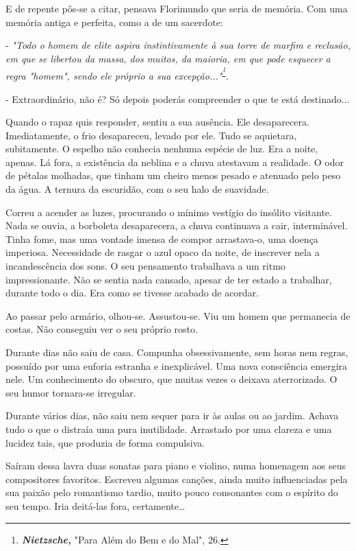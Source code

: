 E de repente pôs-se a citar, pensava Florimundo que seria de memória.
Com uma memória antiga e perfeita, como a de um sacerdote:

- \emph{"Todo o homem de elite aspira instintivamente à sua torre de
marfim e reclusão, em que se libertou da massa, dos muitos, da maioria,
em que pode esquecer a regra "homem", sendo ele próprio a sua
excepção..."}\textsuperscript{\emph{\footnote{\emph{\textbf{Nietzsche,
  }}"Para Além do Bem e do Mal", 26.}}}\emph{.}

- Extraordinário, não é? Só depois poderás compreender o que te está
destinado...

Quando o rapaz quis responder, sentiu a sua ausência. Ele desaparecera.
Imediatamente, o frio desapareceu, levado por ele. Tudo se aquietara,
subitamente. O espelho não conhecia nenhuma espécie de luz. Era a noite,
apenas. Lá fora, a existência da neblina e a chuva atestavam a
realidade. O odor de pétalas molhadas, que tinham um cheiro menos pesado
e atenuado pelo peso da água. A ternura da escuridão, com o seu halo de
suavidade.

Correu a acender as luzes, procurando o mínimo vestígio do insólito
visitante. Nada se ouvia, a borboleta desaparecera, a chuva continuava a
cair, interminável. Tinha fome, mas uma vontade imensa de compor
arrastava-o, uma doença imperiosa. Necessidade de rasgar o azul opaco da
noite, de inscrever nela a incandescência dos sons. O seu pensamento
trabalhava a um ritmo impressionante. Não se sentia nada cansado, apesar
de ter estado a trabalhar, durante todo o dia. Era como se tivesse
acabado de acordar.

Ao passar pelo armário, olhou-se. Assustou-se. Viu um homem que
permanecia de costas. Não conseguiu ver o seu próprio rosto.

Durante dias não saiu de casa. Compunha obsessivamente, sem horas nem
regras, possuído por uma euforia estranha e inexplicável. Uma nova
consciência emergira nele. Um conhecimento do obscuro, que muitas vezes
o deixava aterrorizado. O seu humor tornara-se irregular.

Durante vários dias, não saiu nem sequer para ir às aulas ou ao jardim.
Achava tudo o que o distraía uma pura inutilidade. Arrastado por uma
clareza e uma lucidez tais, que produzia de forma compulsiva.

Saíram dessa lavra duas sonatas para piano e violino, numa homenagem aos
seus compositores favoritos. Escreveu algumas canções, ainda muito
influenciadas pela sua paixão pelo romantismo tardio, muito pouco
consonantes com o espírito do seu tempo. Iria deitá-las fora,
certamente\ldots{}

